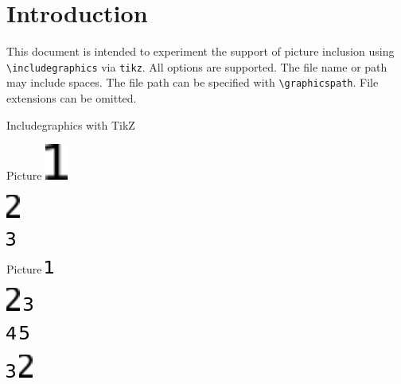 \documentclass{article}
\begin{document}
\section*{Introduction}

This document is intended to experiment the support of picture inclusion using 
\verb|\includegraphics| via \texttt{tikz}. All options are supported.  The file 
name or path may include spaces. The file path can be specified with 
\verb|\graphicspath|. File extensions can be omitted.

\begin{quiz}{Includegraphics with TikZ}

\begin{multi}{Picture}
\includegraphics[width=2em,angle=90]{fig/1 1.PNG}
\item* \includegraphics[scale=.5]{fig/2 2.pdf}
\item \includegraphics{fig/3.png}
\end{multi}

\graphicspath{{./fig/}}
\begin{matching}[dd]{Picture}
\includegraphics{1 1}
\item \includegraphics[angle=45]{2 2} \answer \includegraphics{3}
\item \includegraphics[angle=-45]{4} \answer \includegraphics{5}
\item \includegraphics[scale=2]{3} \answer 
\includegraphics[angle=-180,scale=2]{2 2}
\end{matching}

\end{quiz}
\end{document}
